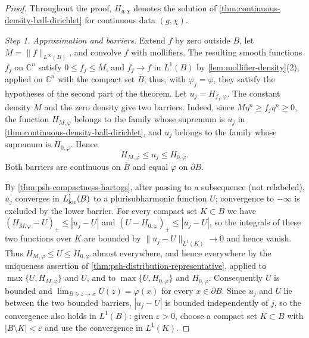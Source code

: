 \begin{proof}
Throughout the proof, $H_{g,\chi}$ denotes the solution of \cref{thm:continuous-density-ball-dirichlet} for continuous data $(g,\chi)$.

\emph{Step 1. Approximation and barriers.}
Extend $f$ by zero outside $B$, let $M=\|f\|_{L^\infty(B)}$, and convolve $f$ with mollifiers. The resulting smooth functions $f_j$ on $\mathbb C^n$ satisfy $0\le f_j\le M$, and $f_j\to f$ in $L^1(B)$ by \cref{lem:mollifier-density}(2), applied on $\mathbb C^n$ with the compact set $\overline B$; thus, with $\varphi_j=\varphi$, they satisfy the hypotheses of the second part of the theorem. Let $u_j=H_{f_j,\varphi}$. The constant density $M$ and the zero density give two barriers. Indeed, since $M\eta^n\ge f_j\eta^n\ge0$, the function $H_{M,\varphi}$ belongs to the family whose supremum is $u_j$ in \cref{thm:continuous-density-ball-dirichlet}, and $u_j$ belongs to the family whose supremum is $H_{0,\varphi}$. Hence
\[
 H_{M,\varphi}\le u_j\le H_{0,\varphi}.
\]
Both barriers are continuous on $\overline B$ and equal $\varphi$ on $\partial B$.

By \cref{thm:psh-compactness-hartogs}, after passing to a subsequence (not relabeled), $u_j$ converges in $L^1_{\mathrm{loc}}(B)$ to a plurisubharmonic function $U$; convergence to $-\infty$ is excluded by the lower barrier. For every compact set $K\subset B$ we have $(H_{M,\varphi}-U)_+\le|u_j-U|$ and $(U-H_{0,\varphi})_+\le|u_j-U|$, so the integrals of these two functions over $K$ are bounded by $\|u_j-U\|_{L^1(K)}\to0$ and hence vanish. Thus $H_{M,\varphi}\le U\le H_{0,\varphi}$ almost everywhere, and hence everywhere by the uniqueness assertion of \cref{thm:psh-distribution-representative}, applied to $\max\{U,H_{M,\varphi}\}$ and $U$, and to $\max\{U,H_{0,\varphi}\}$ and $H_{0,\varphi}$. Consequently $U$ is bounded and $\lim_{B\ni z\to x}U(z)=\varphi(x)$ for every $x\in\partial B$. Since $u_j$ and $U$ lie between the two bounded barriers, $|u_j-U|$ is bounded independently of $j$, so the convergence also holds in $L^1(B)$: given $\varepsilon>0$, choose a compact set $K\subset B$ with $|B\setminus K|<\varepsilon$ and use the convergence in $L^1(K)$.


\end{proof}

